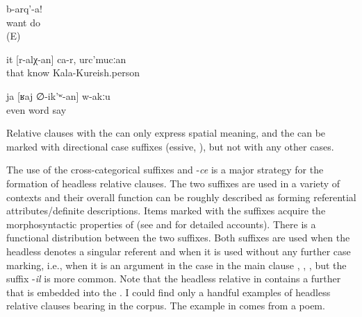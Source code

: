 \begin{exe}
	\ex	\label{ex:Do what you want}
	\gll	[at	b-ikː-an]	b-arq'-a!\\
			want	do\\
	\glt	{} (E)

	\ex	\label{ex:She is the one who I know, from Kala-Kureish}
	\gll	it	[r-alχ-an]	ca-r,	urc'mucːan\\
		that	know		Kala-Kureish.person\\
	\glt	{}

	\ex	\label{ex:There is even nobody who is talking.}
	\gll	ja	[ʁaj	∅-ik'ʷ-an]	w-akːu\\
		even	word	say	\\
	\glt	{}
\end{exe}

Relative clauses with the  can only express spatial meaning, and the  can be marked with directional case suffixes (essive, ), but not with any other cases.

The use of the cross-categorical suffixes  and -\textit{ce} is a major strategy for the formation of headless relative clauses. The two suffixes are used in a variety of contexts and their overall function can be roughly described as forming referential attributes\slash definite descriptions. Items marked with the suffixes acquire the morphosyntactic properties of  (see  and  for detailed accounts). There is a functional distribution between the two suffixes. Both suffixes are used when the headless  denotes a singular referent and when it is used without any further case marking, i.e., when it is an argument in the  case in the main clause  , , , but the suffix -\textit{il} is more common. Note that the headless relative in  contains a further  that is embedded into the . I could find only a handful examples of headless relative clauses bearing  in the corpus. The example in  comes from a poem.  


